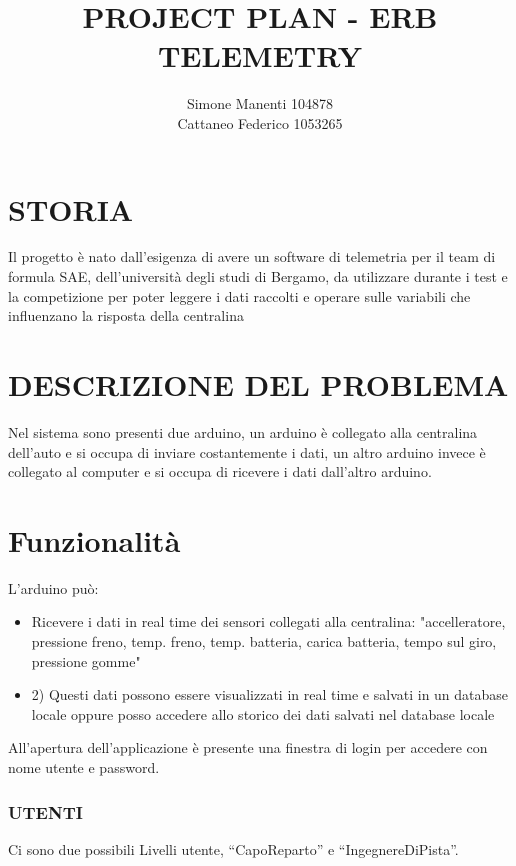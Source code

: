 \documentclass{report}
\title{PROJECT PLAN - ERB TELEMETRY}
\author{Simone Manenti 104878\\ Cattaneo Federico 1053265}
\begin{document}
\maketitle

\chapter{STORIA}
Il progetto è nato dall’esigenza di avere un software di telemetria per il team di formula SAE, dell’università degli studi di Bergamo, da utilizzare durante i test e la competizione per poter leggere i dati raccolti e operare sulle variabili che influenzano la risposta della centralina

\chapter{DESCRIZIONE DEL PROBLEMA}
Nel sistema sono presenti due arduino, un arduino è collegato alla centralina dell'auto e si occupa di inviare costantemente i dati, un altro arduino invece è collegato al computer e si occupa di ricevere i dati dall'altro arduino.\\

\chapter{Funzionalità}
L'arduino può:\\

\begin{itemize}
\item Ricevere i dati in real time dei sensori collegati alla centralina: "accelleratore, pressione freno, temp. freno, temp. batteria, carica batteria, tempo sul giro, pressione gomme"
\item 2)	Questi dati possono essere visualizzati in real time e salvati in un database locale oppure posso accedere allo storico dei dati salvati nel database locale\\
\end{itemize}

All'apertura dell'applicazione è presente una finestra di login per accedere con nome utente e password.\\

\subsection{UTENTI}
Ci sono due possibili Livelli utente, “CapoReparto” e “IngegnereDiPista”.\\
\end{document}
